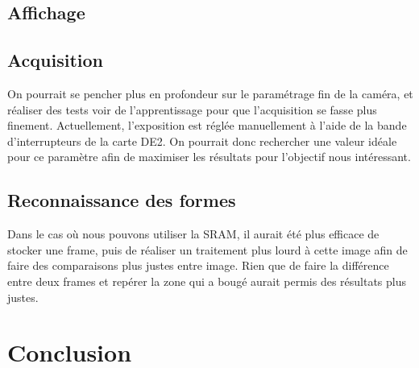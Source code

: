 \documentclass[10pt,a4paper]{report}
\begin{document}
\section{Affichage}



\section{Acquisition}

On pourrait se pencher plus en profondeur sur le paramétrage fin de la caméra, et réaliser des tests voir de l'apprentissage pour que l'acquisition se fasse plus finement. Actuellement, l'exposition est réglée manuellement à l'aide de la bande d'interrupteurs de la carte DE2. On pourrait donc rechercher une valeur idéale pour ce paramètre afin de maximiser les résultats pour l'objectif nous intéressant.

\section{Reconnaissance des formes}

Dans le cas où nous pouvons utiliser la SRAM, il aurait été plus efficace de stocker une frame, puis de réaliser un traitement plus lourd à cette image afin de faire des comparaisons plus justes entre image. Rien que de faire la différence entre deux frames et repérer la zone qui a bougé aurait permis des résultats plus justes.

\chapter{Conclusion}
\end{document}
